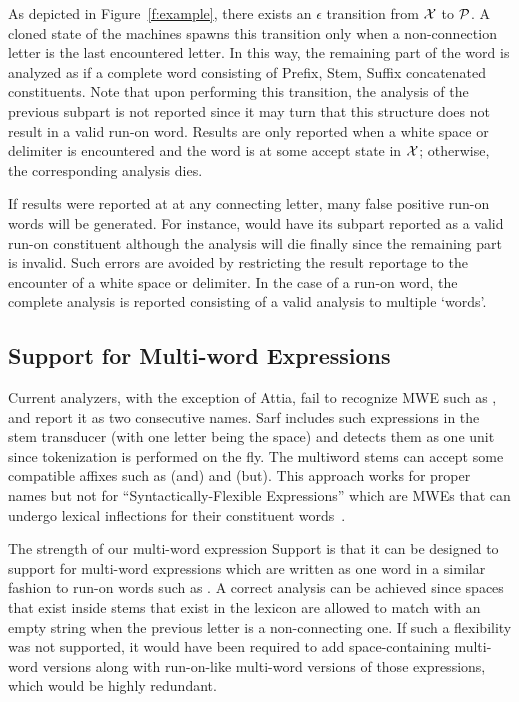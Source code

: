 \documentclass[a4,12pt]{report}
\newcommand{\noTrRL}[1]{\transfalse\RL{#1}\transtrue}
\newcommand{\noTrnoVocRL}[1]{\transfalse\novocalize\noTrRL{#1}\vocalize\transtrue}
\newcommand{\noVocRL}[1]{\transtrue\novocalize\RL{#1}\vocalize}
\begin{document}
As depicted in Figure~\ref{f:example}, there exists an $\epsilon$ 
transition from ${\cal X}$ to ${\cal P}$.
A cloned state of the machines spawns this transition 
only when a non-connection letter is the last encountered letter.
In this way, the remaining part of the word is analyzed as if a 
complete word consisting of Prefix, Stem, Suffix concatenated constituents.
Note that upon performing this transition, the analysis of the previous subpart is
not reported since it may turn that this structure does not result in a valid run-on word.
Results are only reported when a white space or delimiter is encountered
and the word is at some accept state in ${\cal X}$; otherwise, the corresponding
analysis dies.

If results were reported at at any connecting letter, many false positive 
run-on words will be generated. For instance, \noVocRL{al-madrasaT} would have its 
\noVocRL{al-mad} subpart reported as a valid run-on constituent although the analysis
will die finally since the remaining part \noVocRL{rasaT} is invalid. Such errors are 
avoided by restricting the result reportage to the encounter of a white space or delimiter.
In the case of a run-on word, the complete analysis is reported consisting of a valid analysis 
to multiple `words'.


\subsection{Support for Multi-word Expressions}
\label{sec:MWE}

Current analyzers, with the exception of Attia, fail to recognize MWE such as \noTrnoVocRL{`bid alkarym}, and 
report it as two consecutive names. 
Sarf includes such expressions in the stem transducer (with one letter being the space) and 
detects them as one unit since tokenization
is performed on the fly. The multiword stems
can accept some compatible affixes such as  (and) and  (but).
This approach works for proper names but not for ``Syntactically-Flexible Expressions'' which are
MWEs that can undergo lexical inflections for their constituent words~\cite{MWE}.

The strength of our multi-word expression Support is that it can be designed to support for
multi-word expressions which are written as one word in a similar fashion to run-on words such as
\noVocRL{`abidAl-ra.hyim}. A correct analysis can be achieved since spaces that exist inside stems 
that exist in the lexicon are allowed to match with an empty string when the previous letter is a
non-connecting one. If such a flexibility was not supported, it would have been required to add
space-containing multi-word versions along with run-on-like multi-word versions of those expressions,
which would be highly redundant. 
\end{document}
